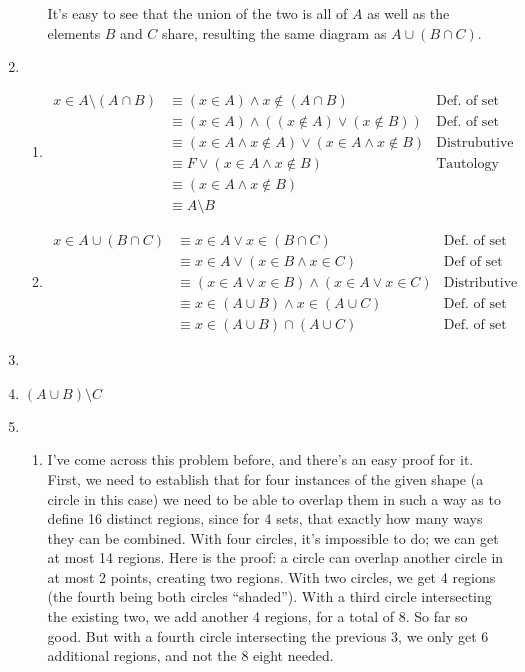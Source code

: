 \documentclass{article}
\begin{document}
\begin{enumerate}
\begin{enumerate}
  It's easy to see that the union of the two is all of $A$ as well as the elements $B$ and $C$ share, resulting the same diagram as $A \cup (B \cap C)$.
  \end{enumerate}
\item
  \begin{enumerate}
  \item
    \begin{equation*}
      \begin{aligned}
	x \in A \setminus (A \cap B) &\equiv (x \in A) \land x \notin (A \cap B) & \text{Def. of set difference} \\
	&\equiv (x \in A) \land ((x \notin A) \lor (x \notin B)) & \text{Def. of set intersect}\\
	&\equiv (x \in A \land x \notin A) \lor (x \in A \land x \notin B) & \text{Distrubutive rule}\\
	&\equiv F \lor (x \in A \land x \notin B) & \text{Tautology}\\
	&\equiv (x \in A \land x \notin B) \\
	&\equiv A \setminus B
      \end{aligned}
    \end{equation*}
  \item
    \begin{equation*}
      \begin{aligned}
        x \in A \cup (B \cap C) &\equiv x \in A \lor x \in (B \cap C) & \text{Def. of set union} \\
        &\equiv x \in A \lor (x \in B \land x \in C) & \text{Def of set intersect}\\
        &\equiv (x \in A \lor x \in B) \land (x \in A \lor x \in C) & \text{Distributive rule}\\
        &\equiv x \in (A \cup B) \land x \in (A \cup C) & \text{Def. of set union} \\
        &\equiv x \in (A \cup B) \cap (A \cup C) & \text{Def. of set intersect}
        \end{aligned}
      \end{equation*}
    \end{enumerate}
\item
\item
  $(A \cup B) \setminus C$
  \item
  \begin{enumerate}
    \item
  I've come across this problem before, and there's an easy proof for it.  First, we need to establish that for four instances of the given shape (a circle in this case) we need to be able to overlap them in such a way as to define 16 distinct regions, since for 4 sets, that exactly how many ways they can be combined.	 With four circles, it's impossible to do; we can get at most 14 regions.  Here is the proof: a circle can overlap another circle in at most 2 points, creating two regions.  With two circles, we get 4 regions (the fourth being both circles ``shaded'').  With a third circle intersecting the existing two, we add another 4 regions, for a total of 8.  So far so good.  But with a fourth circle intersecting the previous 3, we only get 6 additional regions, and not the 8 eight needed.

\end{enumerate}
\end{enumerate}
\end{document}
